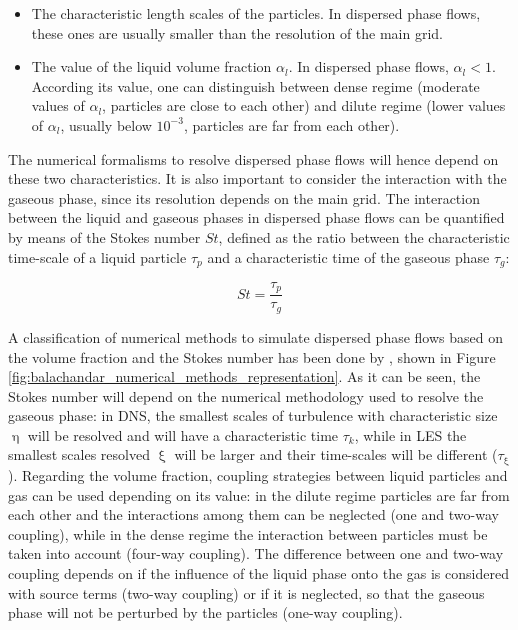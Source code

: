 \begin{itemize}

	\item The characteristic length scales of the particles. In dispersed phase flows, these ones are usually smaller than the resolution of the main grid.
	
	\item The value of the liquid volume fraction $\alpha_l$. In dispersed phase flows, $\alpha_l < 1$. According its value, one can distinguish between dense regime (moderate values of $\alpha_l$, particles are close to each other) and dilute regime (lower values of $\alpha_l$, usually below $10^{-3}$, particles are far from each other).

\end{itemize}

The numerical formalisms to resolve dispersed phase flows will hence depend on these two characteristics. It is also important to consider the interaction with the gaseous phase, since its resolution depends on the main grid. The interaction between the liquid and gaseous phases in dispersed phase flows can be quantified by means of the Stokes number $St$, defined as the ratio between the characteristic time-scale of a liquid particle $\tau_p$ and a characteristic time of the gaseous phase $\tau_g$: 

\begin{equation}
\label{eq:Stokes_number_definition_general}
St = \frac{\tau_p}{\tau_g}
\end{equation}

A classification of numerical methods to simulate dispersed phase flows based on the volume fraction and the Stokes number has been done by , shown in Figure \ref{fig:balachandar_numerical_methods_representation}. As it can be seen, the Stokes number will depend on the numerical methodology used to resolve the gaseous phase: in DNS, the smallest scales of turbulence with characteristic size $\upeta$ will be resolved and will have a characteristic time $\tau_k$, while in LES the smallest scales resolved $\upxi$ will be larger and their time-scales will be different ($\tau_\upxi$). Regarding the volume fraction, coupling strategies between liquid particles and gas can be used depending on its value: in the dilute regime particles are far from each other and the interactions among them can be neglected (one and two-way coupling), while in the dense regime the interaction between particles must be taken into account (four-way coupling). The difference between one and two-way coupling depends on if the influence of the liquid phase onto the gas is considered with source terms (two-way coupling) or if it is neglected, so that the gaseous phase will not be perturbed by the particles (one-way coupling).


